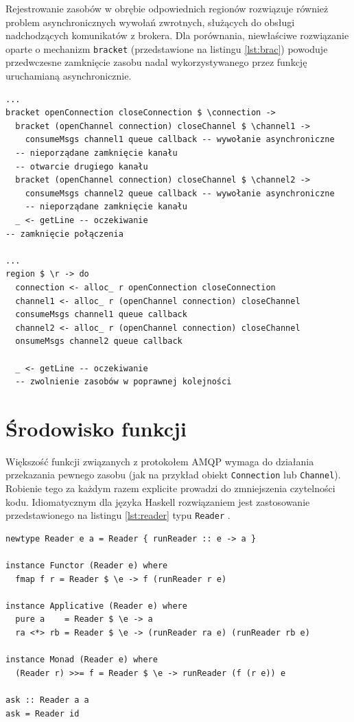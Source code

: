 Rejestrowanie zasobów w obrębie odpowiednich regionów rozwiązuje również problem asynchronicznych wywołań zwrotnych, służących do obsługi nadchodzących komunikatów z brokera. Dla porównania, niewłaściwe rozwiązanie oparte o mechanizm \lstinline{bracket} (przedstawione na listingu \ref{lst:brac}) powoduje przedwczesne zamknięcie zasobu nadal wykorzystywanego przez funkcję uruchamianą asynchronicznie.
\begin{lstlisting}[caption=Problem funkcji asynchronicznych, label=lst:brac]
...
bracket openConnection closeConnection $ \connection ->
  bracket (openChannel connection) closeChannel $ \channel1 ->
    consumeMsgs channel1 queue callback -- wywołanie asynchroniczne
  -- nieporządane zamknięcie kanału
  -- otwarcie drugiego kanału
  bracket (openChannel connection) closeChannel $ \channel2 ->
    consumeMsgs channel2 queue callback -- wywołanie asynchroniczne
    -- nieporządane zamknięcie kanału
  _ <- getLine -- oczekiwanie
-- zamknięcie połączenia

...
region $ \r -> do
  connection <- alloc_ r openConnection closeConnection
  channel1 <- alloc_ r (openChannel connection) closeChannel
  consumeMsgs channel1 queue callback
  channel2 <- alloc_ r (openChannel connection) closeChannel
  onsumeMsgs channel2 queue callback

  _ <- getLine -- oczekiwanie
  -- zwolnienie zasobów w poprawnej kolejności
\end{lstlisting}
\newpage

\section{Środowisko funkcji}
Większość funkcji związanych z protokołem AMQP wymaga do działania przekazania pewnego zasobu (jak na przykład obiekt \lstinline{Connection} lub \lstinline{Channel}). Robienie tego za każdym razem explicite prowadzi do zmniejszenia czytelności kodu. Idiomatycznym dla języka Haskell rozwiązaniem jest zastosowanie przedstawionego na listingu \ref{lst:reader} typu \lstinline{Reader} \cite{Reader}.
\begin{lstlisting}[caption=Typ reader, label=lst:reader]
newtype Reader e a = Reader { runReader :: e -> a }

instance Functor (Reader e) where
  fmap f r = Reader $ \e -> f (runReader r e)

instance Applicative (Reader e) where
  pure a    = Reader $ \e -> a
  ra <*> rb = Reader $ \e -> (runReader ra e) (runReader rb e)

instance Monad (Reader e) where 
  (Reader r) >>= f = Reader $ \e -> runReader (f (r e)) e

ask :: Reader a a
ask = Reader id
\end{lstlisting}

